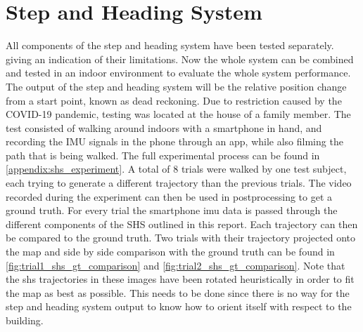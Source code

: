\section{Step and Heading System}
All components of the step and heading system have been tested separately. giving an indication of their limitations. Now the whole system can be combined and tested in an indoor environment to evaluate the whole system performance. The output of the step and heading system will be the relative position change from a start point, known as dead reckoning.
Due to restriction caused by the COVID-19 pandemic, testing was located at the house of a family member. The test consisted of walking around indoors with a smartphone in hand, and recording the IMU signals in the phone through an app, while also filming the path that is being walked. The full experimental process can be found in \cref{appendix:shs_experiment}. A total of 8 trials were walked by one test subject, each trying to generate a different trajectory than the previous trials. The video recorded during the experiment can then be used in postprocessing to get a ground truth. For every trial the smartphone imu data is passed through the different components of the SHS outlined in this report. Each trajectory can then be compared to the ground truth. Two trials with their trajectory projected onto the map and side by side comparison with the ground truth can be found in \cref{fig:trial1_shs_gt_comparison} and \cref{fig:trial2_shs_gt_comparison}. Note that the shs trajectories in these images have been rotated heuristically in order to fit the map as best as possible. This needs to be done since there is no way for the step and heading system output to know how to orient itself with respect to the building.

